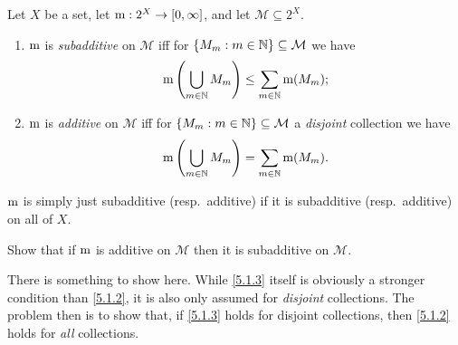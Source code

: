 \begin{dfn}
Let $X$ be a set, let $\mathrm{m} :2^X\rightarrow [0,\infty ]$, and let $\mathcal{M}\subseteq 2^X$.  
\begin{enumerate}
\item $\mathrm{m}$ is \emph{subadditive} on $\mathcal{M}$ iff for $\{ M_m:m\in \mathbb{N} \} \subseteq \mathcal{M}$ we have
\begin{equation}\label{5.1.2}
\mathrm{m} \left( \bigcup _{m\in \mathbb{N}}M_m\right) \leq \sum _{m\in \mathbb{N}}\mathrm{m} (M_m);
\end{equation}
\item $\mathrm{m}$ is \emph{additive} on $\mathcal{M}$ iff for $\{ M_m:m\in \mathbb{N} \} \subseteq \mathcal{M}$ a \emph{disjoint} collection we have
\begin{equation}\label{5.1.3}
\mathrm{m} \left( \bigcup _{m\in \mathbb{N}}M_m\right) =\sum _{m\in \mathbb{N}}\mathrm{m} (M_m).
\end{equation}
\end{enumerate}
$\mathrm{m}$ is simply just subadditive (resp.~additive) if it is subadditive (resp.~additive) on all of $X$.
\end{dfn}
\begin{exr}\label{exr5.1.4}
Show that if $\mathrm{m}$ is additive on $\mathcal{M}$ then it is subadditive on $\mathcal{M}$.
\begin{rmk}
There is something to show here.  While \eqref{5.1.3} itself is obviously a stronger condition than \eqref{5.1.2}, it is also only assumed for \emph{disjoint} collections.  The problem then is to show that, if \eqref{5.1.3} holds for disjoint collections, then \eqref{5.1.2} holds for \emph{all} collections.
\end{rmk}
\end{exr}

